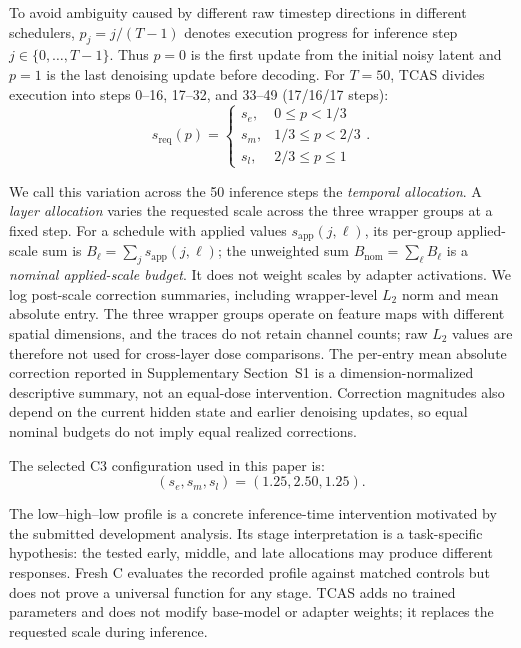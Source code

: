 \documentclass[times,twocolumn,final]{elsarticle}
\begin{document}
To avoid ambiguity caused by different raw timestep directions in different schedulers, $p_j=j/(T-1)$ denotes execution progress for inference step $j\in\{0,\ldots,T-1\}$. Thus $p=0$ is the first update from the initial noisy latent and $p=1$ is the last denoising update before decoding. For $T=50$, TCAS divides execution into steps 0--16, 17--32, and 33--49 (17/16/17 steps):
\begin{equation}
s_{\mathrm{req}}(p) = \begin{cases} s_e, & 0 \leq p < 1/3 \\ s_m, & 1/3 \leq p < 2/3 \\ s_l, & 2/3 \leq p \leq 1 \end{cases}.
\label{eq:tcas}
\end{equation}

We call this variation across the 50 inference steps the \emph{temporal allocation}. A \emph{layer allocation} varies the requested scale across the three wrapper groups at a fixed step. For a schedule with applied values $s_{\mathrm{app}}(j,\ell)$, its per-group applied-scale sum is $B_\ell=\sum_j s_{\mathrm{app}}(j,\ell)$; the unweighted sum $B_{\mathrm{nom}}=\sum_\ell B_\ell$ is a \emph{nominal applied-scale budget}. It does not weight scales by adapter activations. We log post-scale correction summaries, including wrapper-level $L_2$ norm and mean absolute entry. The three wrapper groups operate on feature maps with different spatial dimensions, and the traces do not retain channel counts; raw $L_2$ values are therefore not used for cross-layer dose comparisons. The per-entry mean absolute correction reported in Supplementary Section~S1 is a dimension-normalized descriptive summary, not an equal-dose intervention. Correction magnitudes also depend on the current hidden state and earlier denoising updates, so equal nominal budgets do not imply equal realized corrections.

The selected C3 configuration used in this paper is:
\begin{equation}
(s_e, s_m, s_l) = (1.25, 2.50, 1.25).
\end{equation}

The low--high--low profile is a concrete inference-time intervention motivated by the submitted development analysis. Its stage interpretation is a task-specific hypothesis: the tested early, middle, and late allocations may produce different responses. Fresh C evaluates the recorded profile against matched controls but does not prove a universal function for any stage. TCAS adds no trained parameters and does not modify base-model or adapter weights; it replaces the requested scale during inference.
\end{document}
